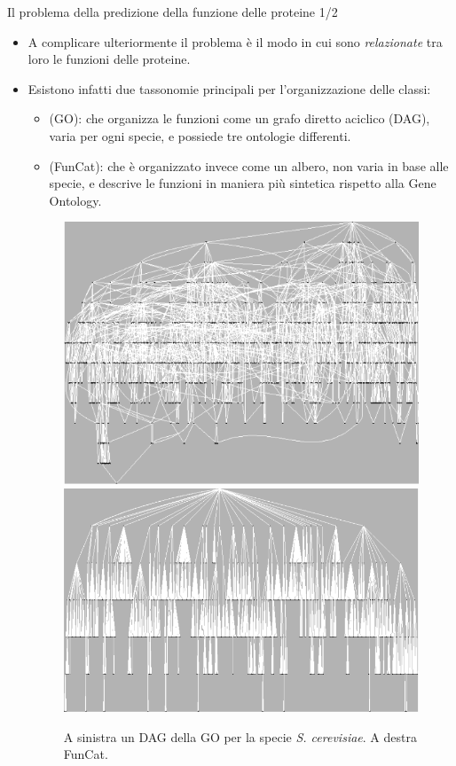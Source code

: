 \documentclass[9pt]{beamer}
\begin{document}
\begin{tframe}{Il problema della predizione della funzione delle proteine 1/2}
\begin{itemize}
\item A complicare ulteriormente il problema è il modo in cui sono \emph{relazionate} tra loro le funzioni delle proteine.
\item Esistono infatti due tassonomie principali per l'organizzazione delle classi:
\begin{itemize}

\item {} (GO):  che organizza le funzioni come un grafo diretto aciclico (DAG), varia per ogni specie, e possiede tre ontologie differenti.
\item {} (FunCat): che è organizzato invece come un albero, non varia in base alle specie, e descrive le funzioni in maniera più sintetica rispetto alla Gene Ontology.
\end{itemize}
\begin{figure}[h]
\center
\includegraphics[scale=0.18]{./img/GO.png}
\includegraphics[scale=0.17]{./img/FunCat.png}
\caption{\footnotesize{A sinistra un DAG della GO per la specie \emph{S. cerevisiae}. A destra FunCat.}}
\label{DAGTREE}
\end{figure}
\end{itemize}  
\end{tframe}
\end{document}
